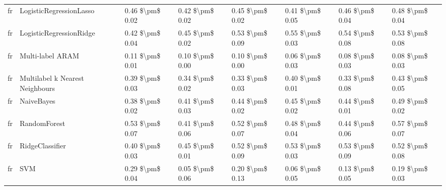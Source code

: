 \begin{tabular}{llllllll}
      fr &         LogisticRegressionLasso & 0.46 \$\textbackslash pm\$ 0.02 &           0.42 \$\textbackslash pm\$ 0.02 &       0.45 \$\textbackslash pm\$ 0.02 &        0.41 \$\textbackslash pm\$ 0.05 &                         0.46 \$\textbackslash pm\$ 0.04 &     0.48 \$\textbackslash pm\$ 0.04 \\
      fr &         LogisticRegressionRidge & 0.42 \$\textbackslash pm\$ 0.04 &           0.45 \$\textbackslash pm\$ 0.02 &       0.53 \$\textbackslash pm\$ 0.09 &        0.55 \$\textbackslash pm\$ 0.03 &                         0.54 \$\textbackslash pm\$ 0.08 &     0.53 \$\textbackslash pm\$ 0.08 \\
      fr &                Multi-label ARAM & 0.11 \$\textbackslash pm\$ 0.01 &           0.10 \$\textbackslash pm\$ 0.00 &       0.10 \$\textbackslash pm\$ 0.00 &        0.06 \$\textbackslash pm\$ 0.03 &                         0.08 \$\textbackslash pm\$ 0.03 &     0.08 \$\textbackslash pm\$ 0.03 \\
      fr & Multilabel k Nearest Neighbours & 0.39 \$\textbackslash pm\$ 0.03 &           0.34 \$\textbackslash pm\$ 0.02 &       0.33 \$\textbackslash pm\$ 0.03 &        0.40 \$\textbackslash pm\$ 0.01 &                         0.33 \$\textbackslash pm\$ 0.08 &     0.43 \$\textbackslash pm\$ 0.05 \\
      fr &                      NaiveBayes & 0.38 \$\textbackslash pm\$ 0.02 &           0.41 \$\textbackslash pm\$ 0.03 &       0.44 \$\textbackslash pm\$ 0.02 &        0.45 \$\textbackslash pm\$ 0.02 &                         0.44 \$\textbackslash pm\$ 0.01 &     0.49 \$\textbackslash pm\$ 0.02 \\
      fr &                    RandomForest & 0.53 \$\textbackslash pm\$ 0.07 &           0.41 \$\textbackslash pm\$ 0.06 &       0.52 \$\textbackslash pm\$ 0.07 &        0.48 \$\textbackslash pm\$ 0.04 &                         0.44 \$\textbackslash pm\$ 0.06 &     0.57 \$\textbackslash pm\$ 0.07 \\
      fr &                 RidgeClassifier & 0.40 \$\textbackslash pm\$ 0.03 &           0.45 \$\textbackslash pm\$ 0.01 &       0.52 \$\textbackslash pm\$ 0.09 &        0.53 \$\textbackslash pm\$ 0.03 &                         0.53 \$\textbackslash pm\$ 0.09 &     0.52 \$\textbackslash pm\$ 0.08 \\
      fr &                             SVM & 0.29 \$\textbackslash pm\$ 0.04 &           0.05 \$\textbackslash pm\$ 0.06 &       0.20 \$\textbackslash pm\$ 0.13 &        0.06 \$\textbackslash pm\$ 0.05 &                         0.13 \$\textbackslash pm\$ 0.05 &     0.19 \$\textbackslash pm\$ 0.03 \\

\end{tabular}
